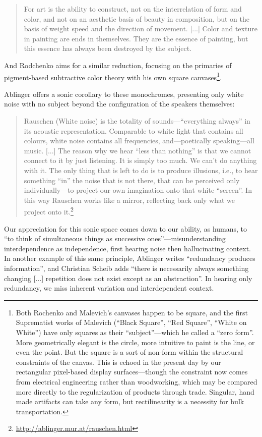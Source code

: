 \documentclass{thesis}
\begin{document}
	\begin{quote}
	For art is the ability to construct, not on the interrelation of form and color, and not on an aesthetic basis of beauty in composition, but on the basis of weight speed and the direction of movement. [...] Color and texture in painting are ends in themselves. They are the essence of painting, but this essence has always been destroyed by the subject.
	\end{quote}
	
And Rodchenko aims for a similar reduction, focusing on the primaries of pigment-based subtractive color theory with his own square canvases\footnote{Both Rochenko and Malevich's canvases happen to be square, and the first Suprematist works of Malevich (``Black Square'', ``Red Square'', ``White on White'') have only squares as their ``subject''---which he called a ``zero form''. More geometrically elegant is the circle, more intuitive to paint is the line, or even the point. But the square is a sort of non-form within the structural constraints of the canvas. This is echoed in the present day by our rectangular pixel-based display surfaces---though the constraint now comes from electrical engineering rather than woodworking, which may be compared more directly to the regularization of products through trade. Singular, hand made artifacts can take any form, but rectilinearity is a necessity for bulk transportation.}.

Ablinger offers a sonic corollary to these monochromes, presenting only white noise with no subject beyond the configuration of the speakers themselves:

	\begin{quote}
	Rauschen (White noise) is the totality of sounds---``everything always'' in its acoustic representation. Comparable to white light that contains all colours, white noise contains all frequencies, and---poetically speaking---all music. [...] The reason why we hear ``less than nothing'' is that we cannot connect to it by just listening. It is simply too much. We can't do anything with it. The only thing that is left to do is to produce illusions, i.e., to hear something ``in'' the noise that is not there, that can be perceived only individually---to project our own imagination onto that white ``screen''. In this way Rauschen works like a mirror, reflecting back only what we project onto it.\footnote{\url{http://ablinger.mur.at/rauschen.html}}
	\end{quote}
	
Our appreciation for this sonic space comes down to our ability, as humans, to ``to think of simultaneous things as successive ones''\cite{christian_scheib_statics_????}---misunderstanding interdependence as independence, first hearing noise then hallucinating context. In another example of this same principle, Ablinger writes ``redundancy produces information'', and Christian Scheib adds ``there is necessarily always something changing [...] repetition does not exist except as an abstraction''. In hearing only redundancy, we miss inherent variation and interdependent context.
	
\end{document}
